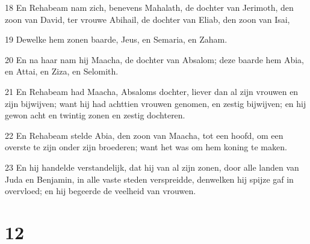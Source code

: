 \par 18 En Rehabeam nam zich, benevens Mahalath, de dochter van Jerimoth, den zoon van David, ter vrouwe Abihail, de dochter van Eliab, den zoon van Isai,
\par 19 Dewelke hem zonen baarde, Jeus, en Semaria, en Zaham.
\par 20 En na haar nam hij Maacha, de dochter van Absalom; deze baarde hem Abia, en Attai, en Ziza, en Selomith.
\par 21 En Rehabeam had Maacha, Absaloms dochter, liever dan al zijn vrouwen en zijn bijwijven; want hij had achttien vrouwen genomen, en zestig bijwijven; en hij gewon acht en twintig zonen en zestig dochteren.
\par 22 En Rehabeam stelde Abia, den zoon van Maacha, tot een hoofd, om een overste te zijn onder zijn broederen; want het was om hem koning te maken.
\par 23 En hij handelde verstandelijk, dat hij van al zijn zonen, door alle landen van Juda en Benjamin, in alle vaste steden verspreidde, denwelken hij spijze gaf in overvloed; en hij begeerde de veelheid van vrouwen.

\chapter{12}

